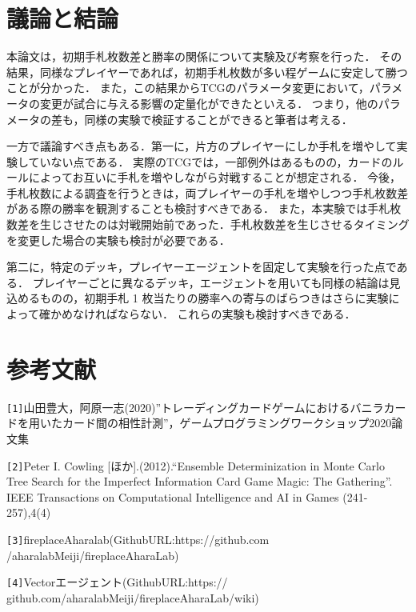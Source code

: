 \documentclass[twocolumn]{ltjsarticle}
\begin{document}
\section{議論と結論}
\small{
  本論文は，初期手札枚数差と勝率の関係について実験及び考察を行った．
  その結果，同様なプレイヤーであれば，初期手札枚数が多い程ゲームに安定して勝つことが分かった．
  また，この結果からTCGのパラメータ変更において，パラメータの変更が試合に与える影響の定量化ができたといえる．
  つまり，他のパラメータの差も，同様の実験で検証することができると筆者は考える．
  
  一方で議論すべき点もある．第一に，片方のプレイヤーにしか手札を増やして実験していない点である．
  実際のTCGでは，一部例外はあるものの，カードのルールによってお互いに手札を増やしながら対戦することが想定される．
  今後，手札枚数による調査を行うときは，両プレイヤーの手札を増やしつつ手札枚数差がある際の勝率を観測することも検討すべきである．
  また，本実験では手札枚数差を生じさせたのは対戦開始前であった．手札枚数差を生じさせるタイミングを変更した場合の実験も検討が必要である．
  
  第二に，特定のデッキ，プレイヤーエージェントを固定して実験を行った点である．
  プレイヤーごとに異なるデッキ，エージェントを用いても同様の結論は見込めるものの，初期手札 1 枚当たりの勝率への寄与のばらつきはさらに実験によって確かめなければならない．
  これらの実験も検討すべきである．
}
\section{
  参考文献
}
\small{
  \verb#[1]#山田豊大，阿原一志(2020)”トレーディングカードゲームにおけるバニラカードを用いたカード間の相性計測”，ゲームプログラミングワークショップ2020論文集

  \verb#[2]#Peter I. Cowling [ほか].(2012).“Ensemble
  Determinization in Monte Carlo Tree Search for the
  Imperfect Information Card Game Magic: The Gathering”.
  IEEE Transactions on Computational Intelligence and AI
  in Games (241-257),4(4)

  \verb#[3]#fireplaceAharalab(GithubURL:https://github.com
  /aharalabMeiji/fireplaceAharaLab)

  \verb#[4]#Vectorエージェント(GithubURL:https://
  github.com/aharalabMeiji/fireplaceAharaLab/wiki)
  

  
}
\end{document}
